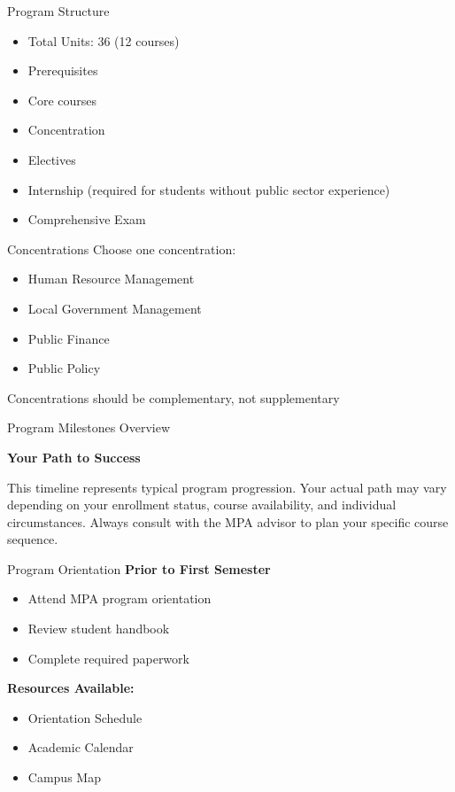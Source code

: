 \documentclass[10pt]{beamer}
\begin{document}
\begin{frame}{Program Structure}
\begin{itemize}
\item Total Units: 36 (12 courses)
\item Prerequisites
\item Core courses
\item Concentration
\item Electives
\item Internship (required for students without public sector experience)
\item Comprehensive Exam
\end{itemize}
\end{frame}

\begin{frame}{Concentrations}
Choose one concentration:
\begin{itemize}
\item Human Resource Management
\item Local Government Management
\item Public Finance
\item Public Policy
\end{itemize}
Concentrations should be complementary, not supplementary
\end{frame}


\begin{frame}{Program Milestones Overview}
    \begin{center}
    \textbf{Your Path to Success}
    \end{center}
    \small{This timeline represents typical program progression. Your actual path may vary depending on your enrollment status, course availability, and individual circumstances. Always consult with the MPA advisor to plan your specific course sequence.}
    \end{frame}
    
    \begin{frame}{Program Orientation}
    \textbf{Prior to First Semester}
    \begin{itemize}
    \item Attend MPA program orientation
    \item Review student handbook
    \item Complete required paperwork
    \end{itemize}
    
    \textbf{Resources Available:}
    \begin{itemize}
    \item Orientation Schedule
    \item Academic Calendar
    \item Campus Map
    \end{itemize}
    \end{frame}
    
\end{document}
